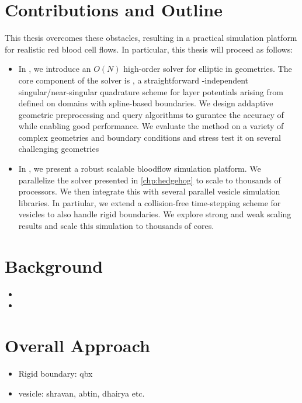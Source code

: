 \section{Contributions and Outline}
This thesis overcomes these obstacles, resulting in a practical simulation platform for realistic red blood cell flows.
In particular, this thesis will proceed as follows:
\begin{itemize}
    \item In , we introduce an $O(N)$ high-order solver for elliptic \pdes in \threed geometries.
        The core component of the solver is \qbkix, a straightforward \pde-independent singular/near-singular quadrature scheme for layer potentials arising from \pdes defined on domains with spline-based boundaries.
        We design addaptive geometric preprocessing and query algorithms to gurantee the accuracy of \qbkix while enabling good performance. 
        We evaluate the method on a variety of complex geometries and boundary conditions and stress test it on several challenging geometries
    \item In , we present a robust scalable bloodflow simulation platform. 
        We parallelize the \pde solver presented in \cref{chp:hedgehog} to scale to thousands of processors.
        We then integrate this with several parallel vesicle simulation libraries. 
        In partiular, we extend a collision-free time-stepping scheme for vesicles to also handle rigid boundaries.
        We explore strong and weak scaling results and scale this simulation to thousands of cores.
\end{itemize}

\section{Background}
\begin{itemize}
    \item {}
    \item {}
\end{itemize}

\section{Overall Approach}
\begin{itemize}
    \item Rigid boundary: qbx
    \item vesicle: shravan, abtin, dhairya etc.
\end{itemize}
